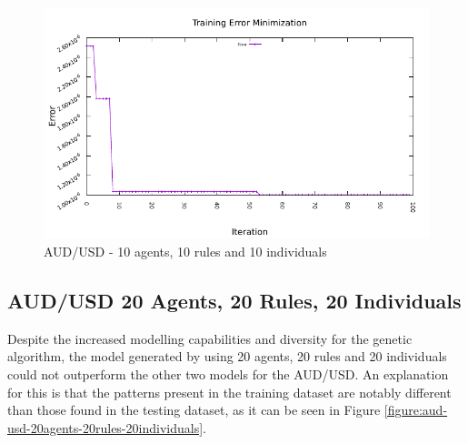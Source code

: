 \begin{figure}[htp]
  \medskip

  \includegraphics[width=.45\textwidth]{img/plots/aud_usd_h1-10agents-10rules-10ind-100gen_error_minimization.pdf}

  \caption{AUD/USD - 10 agents, 10 rules and 10 individuals}
  \label{figure:aud-usd-10agents-10rules-10individuals}
\end{figure}

\newpage

\subsection{AUD/USD 20 Agents, 20 Rules, 20 Individuals}
\label{results:forecast-aud-usd-20agents-20rules-20individuals}

Despite the increased modelling capabilities and diversity for the genetic
algorithm, the model generated by using 20 agents, 20 rules and 20 individuals
could not outperform the other two models for the AUD/USD. An explanation for
this is that the patterns present in the training dataset are notably different
than those found in the testing dataset, as it can be seen in Figure
\ref{figure:aud-usd-20agents-20rules-20individuals}.

